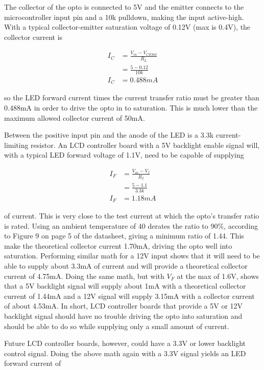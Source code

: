 \documentclass{article}
\begin{document}
The collector of the opto is connected to 5V and the emitter connects to the microcontroller input
pin and a 10k\textOmega{} pulldown, making the input active-high.  With a typical collector-emitter
saturation voltage of 0.12V (max is 0.4V), the collector current is

\begin{align*}
    I_C &= \frac{V_{in} - V_{CESat}}{R_L} \\
    &= \frac{5 - 0.12}{10k} \\
    I_C &= 0.488mA
\end{align*}

so the LED forward current times the current transfer ratio must be greater than 0.488mA in order to
drive the opto in to saturation.  This is much lower than the maximum allowed collector current of
50mA.

Between the positive input pin and the anode of the LED is a 3.3k\textOmega{} current-limiting
resistor.  An LCD controller board with a 5V backlight enable signal will, with a typical LED
forward voltage of 1.1V, need to be capable of supplying

\begin{align*}
    I_F &= \frac{V_{in} - V_f}{R_I} \\
    &= \frac{5 - 1.1}{3.3k} \\
    I_F &= 1.18mA
\end{align*}

of current.  This is very close to the test current at which the opto's transfer ratio is rated.
Using an ambient temperature of 40\textcelsius{} derates the ratio to 90\%, according to Figure 9 on
page 5 of the datasheet, giving a minimum ratio of 1.44.  This make the theoretical collector
current 1.70mA, driving the opto well into saturation.  Performing similar math for a 12V input
shows that it will need to be able to supply about 3.3mA of current and will provide a theoretical
collector current of 4.75mA.  Doing the same math, but with $V_F$ at the max of 1.6V, shows that a
5V backlight signal will supply about 1mA with a theoretical collector current of 1.44mA and a 12V
signal will supply 3.15mA with a collector current of about 4.53mA.  In short, LCD controller boards
that provide a 5V or 12V backlight signal should have no trouble driving the opto into saturation
and should be able to do so while supplying only a small amount of current.

Future LCD controller boards, however, could have a 3.3V or lower backlight control signal.  Doing
the above math again with a 3.3V signal yields an LED forward current of
\end{document}
